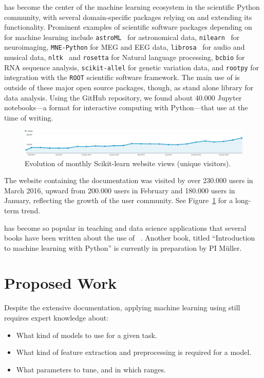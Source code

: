 \sklearn{} has become the center of the machine learning ecosystem in the scientific Python community,
with several domain-specific packages relying on and extending its functionality.
Prominent examples of scientific software packages depending on \sklearn{}
for machine learning include \texttt{astroML}~\autocite{van2013openml} for astronomical
data, \texttt{nilearn}~\autocite{abraham2014machine} for neuroimaging, \texttt{MNE-Python} for MEG
and EEG data, \texttt{librosa}~\autocite{mcfee2015librosa} for audio and musical data,
\texttt{nltk}~\autocite{bird2006nltk} and \texttt{rosetta} for Natural language processing, \texttt{bcbio} for
RNA sequence analysis, \texttt{scikit-allel} for genetic variation data, and \texttt{rootpy} for
integration with the \texttt{ROOT} scientific software framework.
The main use of \sklearn{} is outside of these major open source packages, though,
as stand alone library for data analysis. Using the GitHub repository, we found
about 40.000 Jupyter notebooks---a format for interactive computing with
Python---that use \sklearn{} at the time of writing.

\begin{figure}
    \begin{center}
    \includegraphics[width=.95\linewidth]{scikit-learn_site_visits}
    \end{center}
    \caption{Evolution of monthly Scikit-learn website views (unique visitors).}
    \label{traffic}
\end{figure}

The \sklearn{} website containing the documentation was visited by over
230.000 users in March 2016, upward from 200.000 users in February and 180.000
users in January, reflecting the growth of the \sklearn{} user community. See
Figure~\ref{traffic} for a long-term trend.

\sklearn{} has become so popular in teaching and data science applications that
several books have been written about the use of
\sklearn{}~\autocite{garreta2013learning, hackeling2014mastering,
hauck2014scikit, raschka2015python}. Another book, titled ``Introduction to
machine learning with Python'' is currently in preparation by PI M\"uller.

\section{Proposed Work}
Despite the extensive documentation, applying machine learning using \sklearn{}
still requires expert knowledge about:
\begin{itemize}
    \item What kind of models to use for a given task.
    \item What kind of feature extraction and preprocessing is required for a model.
    \item What parameters to tune, and in which ranges.
\end{itemize}

